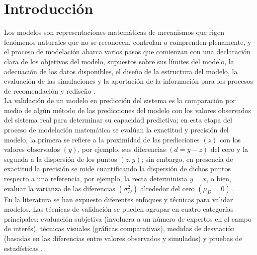 \section{Introducción}
Los modelos son representaciones matemáticas de mecanismos que rigen fenómenos naturales que no se reconocen, controlan o comprenden plenamente, y el proceso de modelación abarca varios pasos que comienzan con una declaración clara de los objetivos del modelo, supuestos sobre sus límites del modelo, la adecuación de los datos disponibles, el diseño de la estructura del modelo, la evaluación de las simulaciones y la aportación de la información para los procesos de recomendación y rediseño \parencite{tedeschi-2006}.\\

La validación de un modelo en predicción del sistema es la comparación por medio de algún método de las predicciones del modelo con los valores observados del sistema real para determinar su capacidad predictiva; en esta etapa del proceso de modelación matemática se evalúan la exactitud y precisión del modelo, la primera se refiere a la proximidad de las predicciones $( z )$ con los valores observados $( y )$, por ejemplo, sus diferencias $ ( d=y-z ) $ del cero y la segunda a la dispersión de los puntos $ (z, y) $; sin embargo, en presencia de exactitud la precisión se mide cuantificando la dispersión de dichos puntos respecto a una referencia, por ejemplo, la recta determinista $ y=x $, o bien, evaluar la varianza de las diferencias $ (\sigma_{D}^{2}) $ alrededor del cero $ (\mu_{D}=0) $ \parencite{medina-peralta-2017}.\\
 
En la literatura se han expuesto diferentes enfoques y técnicas para validar modelos. Las técnicas de validación se pueden agrupar en cuatro categorías principales: evaluación subjetiva (involucra a un número de expertos en el campo de interés), técnicas visuales (gráficas comparativas), medidas de desviación (basadas en las diferencias entre valores observados y simulados) y pruebas de estadísticas \parencite{mayer-butler-1993}.\\
 
